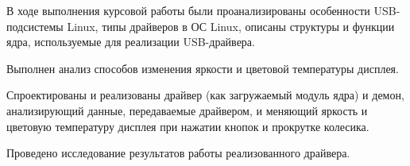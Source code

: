 
В ходе выполнения курсовой работы были проанализированы особенности USB-подсистемы Linux, типы драйверов в ОС Linux, описаны структуры и функции ядра, используемые для реализации USB-драйвера.

Выполнен анализ способов изменения яркости и цветовой температуры дисплея.

Спроектированы и реализованы драйвер (как загружаемый модуль ядра) и демон, анализирующий данные, передаваемые драйвером, и меняющий яркость и цветовую температуру дисплея при нажатии кнопок и прокрутке колесика.

Проведено исследование результатов работы реализованного драйвера.
